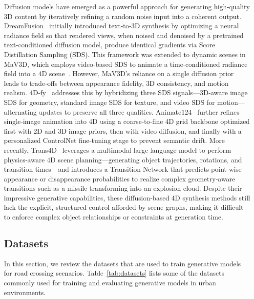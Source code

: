 \documentclass{article}
\begin{document}
Diffusion models have emerged as a powerful approach for generating high‐quality 3D content by iteratively refining a random noise input into a coherent output. DreamFusion~\cite{poole2022dreamfusion} initially introduced text‐to‐3D synthesis by optimizing a neural radiance field so that rendered views, when noised and denoised by a pretrained text‐conditioned diffusion model, produce identical gradients via Score Distillation Sampling (SDS). This framework was extended to dynamic scenes in MaV3D, which employs video‐based SDS to animate a time‐conditioned radiance field into a 4D scene~\cite{singer2023text}. However, MaV3D’s reliance on a single diffusion prior leads to trade‐offs between appearance fidelity, 3D consistency, and motion realism. 4D‐fy~\cite{bahmani20244d} addresses this by hybridizing three SDS signals—3D‐aware image SDS for geometry, standard image SDS for texture, and video SDS for motion—alternating updates to preserve all three qualities. Animate124~\cite{zhao2023animate124} further refines single‐image animation into 4D using a coarse‐to‐fine 4D grid backbone optimized first with 2D and 3D image priors, then with video diffusion, and finally with a personalized ControlNet fine‐tuning stage to prevent semantic drift. More recently, Trans4D~\cite{zeng2024trans4d} leverages a multimodal large language model to perform physics‐aware 4D scene planning—generating object trajectories, rotations, and transition times—and introduces a Transition Network that predicts point‐wise appearance or disappearance probabilities to realize complex geometry‐aware transitions such as a missile transforming into an explosion cloud. Despite their impressive generative capabilities, these diffusion-based 4D synthesis methods still lack the explicit, structured control afforded by scene graphs, making it difficult to enforce complex object relationships or constraints at generation time.


\subsection{Datasets}

In this section, we review the datasets that are used to train generative models for road crossing scenarios. Table~\ref{tab:datasets} lists some of the datasets commonly used for training and evaluating generative models in urban environments.
\end{document}
